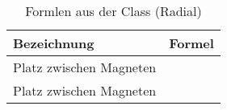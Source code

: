 \begin{table}[h!]

\centering
\caption{Formlen aus der Class (Radial)}
\label{tab:class.rad}
\renewcommand{\arraystretch}{2}
\setlength{\tabcolsep}{10mm}

\begin{tabular}{ll}
    \toprule
     Bezeichnung & Formel\\
    \midrule
	Platz zwischen Magneten&$\frac{}{}$\\
	Platz zwischen Magneten&$\frac{}{}$\\
	
    \bottomrule
  \end{tabular}
\end{table}
